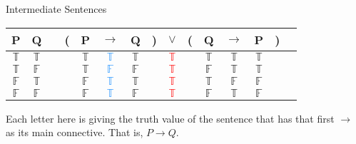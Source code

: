 \documentclass[
  ignorenonframetext,
]{beamer}
\renewcommand{\,}{\text{, }}
\def\True{\mathbb{T}}
\def\False{\mathbb{F}}
\begin{document}
\begin{frame}{Intermediate Sentences}
\protect\hypertarget{intermediate-sentences-1}{}

\begin{center}
\begin{tabular}{@{ }c@{ }@{ }c | c@{ }@{}c@{}@{ }c@{ }@{ }c@{ }@{ }c@{ }@{}c@{}@{ }c@{ }@{}c@{}@{ }c@{ }@{ }c@{ }@{ }c@{ }@{}c@{}@{ }c}
P & Q &  & ( & P & $\rightarrow$ & Q & ) & $\lor$ & ( & Q & $\rightarrow$ & P & ) & \\
\hline 
$\True$ & $\True$ &  &  & $\True$ & \textcolor{dodgerblue}{$\True$} & $\True$ &  & \textcolor{red}{$\True$} &  & $\True$ & $\True$ & $\True$ &  & \\
$\True$ & $\False$ &  &  & $\True$ & \textcolor{dodgerblue}{$\False$} & $\False$ &  & \textcolor{red}{$\True$} &  & $\False$ & $\True$ & $\True$ &  & \\
$\False$ & $\True$ &  &  & $\False$ & \textcolor{dodgerblue}{$\True$} & $\True$ &  & \textcolor{red}{$\True$} &  & $\True$ & $\False$ & $\False$ &  & \\
$\False$ & $\False$ &  &  & $\False$ & \textcolor{dodgerblue}{$\True$} & $\False$ &  & \textcolor{red}{$\True$} &  & $\False$ & $\True$ & $\False$ &  & \\
\end{tabular}
\bigskip
\end{center}

Each letter here is giving the truth value of the sentence that has that
first \(\rightarrow\) as its main connective. That is,
\(P \rightarrow Q\).

\end{frame}
\end{document}

